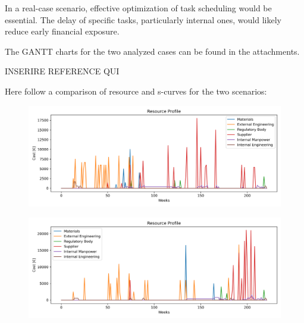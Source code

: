 In a real-case scenario, effective optimization of task scheduling would be essential. The delay of specific tasks, particularly internal ones, would likely reduce early financial exposure.

The GANTT charts for the two analyzed cases can be found in the attachments.

INSERIRE REFERENCE QUI

Here follow a comparison of resource and s-curves for the two scenarios:

\begin{figure}[p]
    \begin{minipage}{\textwidth}
        \centering
        \includegraphics[width=\textwidth]{../resource_profile_E.png}
        \label{fig:resource_profile_early}
    \end{minipage}\hfill
    \begin{minipage}{\textwidth}
        \centering
        \includegraphics[width=\textwidth]{../resource_profile_L.png}
        \label{fig:resource_profile_late}
    \end{minipage}
\end{figure}


